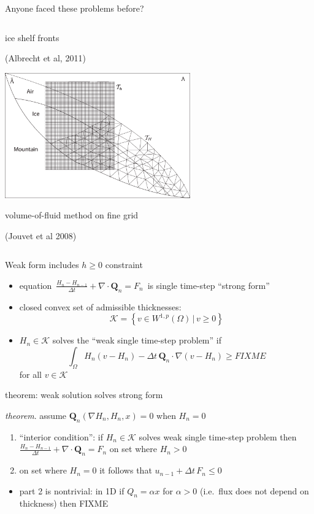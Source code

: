 \documentclass{beamer}
\newcommand\bQ{\mathbf{Q}}
\newcommand{\Div}{\nabla\cdot}
\newcommand{\grad}{\nabla}
\begin{document}
\begin{frame}{Anyone faced these problems before?}
{\begin{columns}
\begin{column}{0.6\textwidth}
\small ice shelf fronts

\tiny (Albrecht et al, 2011)

\small \medskip
\includegraphics[width=0.6\textwidth,keepaspectratio=true]{jouvet-two-grids}

\small volume-of-fluid method on fine grid

\tiny (Jouvet et al 2008)
\end{column}
\end{columns}}

\end{frame}


\begin{frame}{Weak form includes $h\ge 0$ constraint}

  \begin{itemize}
  \item equation \,$\frac{H_n - H_{n-1}}{\Delta t} + \Div \bQ_n = F_n$\, is single time-step ``strong form''
  \item closed convex set of admissible thicknesses:
    $$\mathcal{K} = \left\{v \in W^{1,p}(\Omega) \,\Big|\, v\ge 0\right\}$$
  \item $H_n \in \mathcal{K}$ solves the ``weak single time-step problem'' if
    $$\int_\Omega H_n (v - H_n) - \Delta t\, \bQ_n \cdot \grad(v - H_n) \ge FIXME$$
  for all $v \in \mathcal{K}$
  \end{itemize}
\end{frame}


\begin{frame}{theorem: weak solution solves strong form}

\emph{theorem}.  assume $\bQ_n(\grad H_n,H_n,x)=0$ when $H_n=0$
  \begin{enumerate}
  \item ``interior condition'':  if $H_n \in \mathcal{K}$ solves weak single time-step problem then \,$\frac{H_n - H_{n-1}}{\Delta t} + \Div \bQ_n = F_n$ on set where $H_n>0$
  \item on set where $H_n = 0$ it follows that $u_{n-1} + \Delta t\, F_n \le 0$ 
  \end{enumerate}

\medskip
  \begin{itemize}
  \item part 2 is nontrivial:  in 1D if $Q_n = \alpha x$ for $\alpha >0$ (i.e.~flux does not depend on thickness) then FIXME
  \end{itemize}
\end{frame}
\end{document}
